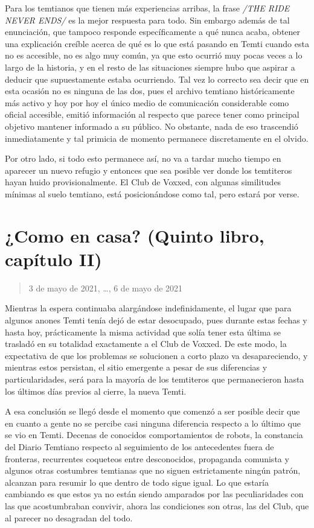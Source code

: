 \documentclass[
]{book}
\begin{document}
Para los temtianos que tienen más experiencias arribas, la frase \emph{/THE RIDE NEVER ENDS/} es la mejor respuesta para todo. Sin embargo además de tal enunciación, que tampoco responde específicamente a qué nunca acaba, obtener una explicación creíble acerca de qué es lo que está pasando en Temti cuando esta no es accesible, no es algo muy común, ya que esto ocurrió muy pocas veces a lo largo de la historia, y en el resto de las situaciones siempre hubo que aspirar a deducir que supuestamente estaba ocurriendo. Tal vez lo correcto sea decir que en esta ocasión no es ninguna de las dos, pues el archivo temtiano históricamente más activo y hoy por hoy el único medio de comunicación considerable como oficial accesible, emitió información al respecto que parece tener como principal objetivo mantener informado a su público. No obstante, nada de eso trascendió inmediatamente y tal primicia de momento permanece discretamente en el olvido.

Por otro lado, si todo esto permanece así, no va a tardar mucho tiempo en aparecer un nuevo refugio y entonces que sea posible ver donde los temtiteros hayan huido provisionalmente. El Club de Voxxed, con algunas similitudes mínimas al suelo temtiano, está posicionándose como tal, pero estará por verse.

\hypertarget{como-en-casa-quinto-libro-capuxedtulo-ii}{%
\section{¿Como en casa? (Quinto libro, capítulo II)}\label{como-en-casa-quinto-libro-capuxedtulo-ii}}

\begin{quote}
3 de mayo de 2021, \ldots, 6 de mayo de 2021
\end{quote}

Mientras la espera continuaba alargándose indefinidamente, el lugar que para algunos anones Temti tenía dejó de estar desocupado, pues durante estas fechas y hasta hoy, prácticamente la misma actividad que solía tener esta última se trasladó en su totalidad exactamente a el Club de Voxxed. De este modo, la expectativa de que los problemas se solucionen a corto plazo va desapareciendo, y mientras estos persistan, el sitio emergente a pesar de sus diferencias y particularidades, será para la mayoría de los temtiteros que permanecieron hasta los últimos días previos al cierre, la nueva Temti.

A esa conclusión se llegó desde el momento que comenzó a ser posible decir que en cuanto a gente no se percibe casi ninguna diferencia respecto a lo último que se vio en Temti. Decenas de conocidos comportamientos de robots, la constancia del Diario Temtiano respecto al seguimiento de los antecedentes fuera de fronteras, recurrentes coqueteos entre desconocidos, propaganda comunista y algunos otras costumbres temtianas que no siguen estrictamente ningún patrón, alcanzan para resumir lo que dentro de todo sigue igual. Lo que estaría cambiando es que estos ya no están siendo amparados por las peculiaridades con las que acostumbraban convivir, ahora las condiciones son otras, las del Club, que al parecer no desagradan del todo.
\end{document}
